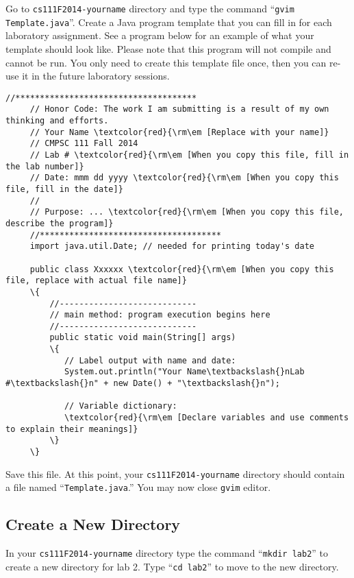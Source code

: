 \noindent Go to {\tt cs111F2014-yourname} directory and type the command ``{\tt gvim Template.java}''.
Create a Java program template that you can fill in for each laboratory assignment. 
See a program below for an example of what your template should look like.
Please note that this program will not compile and cannot be run.
You only need to create this template file once, then you can re-use it
in the future laboratory sessions.
\begin{Verbatim}[commandchars=\\\{\}]
     //*************************************
     // Honor Code: The work I am submitting is a result of my own thinking and efforts.
     // Your Name \textcolor{red}{\rm\em [Replace with your name]}
     // CMPSC 111 Fall 2014
     // Lab # \textcolor{red}{\rm\em [When you copy this file, fill in the lab number]}
     // Date: mmm dd yyyy \textcolor{red}{\rm\em [When you copy this file, fill in the date]}
     //
     // Purpose: ... \textcolor{red}{\rm\em [When you copy this file, describe the program]}
     //*************************************     
     import java.util.Date; // needed for printing today's date
     
     public class Xxxxxx \textcolor{red}{\rm\em [When you copy this file, replace with actual file name]}
     \{
         //----------------------------
         // main method: program execution begins here
         //----------------------------
         public static void main(String[] args)
         \{
            // Label output with name and date:
            System.out.println("Your Name\textbackslash{}nLab #\textbackslash{}n" + new Date() + "\textbackslash{}n");
     
            // Variable dictionary:
            \textcolor{red}{\rm\em [Declare variables and use comments to explain their meanings]}    
         \}
     \}
\end{Verbatim}
\noindent Save this file. At this point, your {\tt cs111F2014-yourname} directory should contain a file named
``{\tt Template.java}.'' You may now close {\tt gvim} editor.


\subsection*{Create a New Directory}

In your {\tt cs111F2014-yourname} directory type the command ``{\tt mkdir lab2}'' to create a new directory for lab 2.
\noindent Type ``{\tt cd lab2}'' to move to the new directory.  

